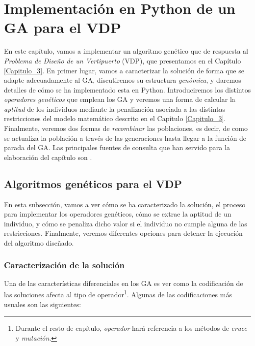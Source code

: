 \documentclass[12pt,a4paper]{book}
\begin{document}
\chapter{Implementación en Python de un GA para el VDP} \label{Capítulo 4}
En este capítulo, vamos a implementar un algoritmo genético que de respuesta al \textsl{Problema de Diseño de un Vertipuerto} (VDP), que presentamos en el Capítulo \ref{Capitulo_3}. En primer lugar, vamos a caracterizar la solución de forma que se adapte adecuadamente al GA, discutiremos su estructura \textsl{genómica}, y daremos detalles de cómo se ha implementado esta en Python. Introduciremos los distintos \textsl{operadores genéticos} que emplean los GA y veremos una forma de calcular la \textsl{aptitud} de los individuos mediante la penalización asociada a las distintas  restricciones del modelo matemático descrito en el Capítulo \ref{Capitulo_3}. Finalmente, veremos dos formas de \textsl{recombinar} las poblaciones, es decir, de como se actualiza la población a través de las generaciones hasta llegar a la función de parada del GA. Las principales fuentes de consulta que han servido para la elaboración del capítulo son  \cite{e_besada_optimizacion_nodate, gestal_pose_introduccion_2023, joines_use_1994, park_vertiport_2022, yu_introduction_2010}.

\section{Algoritmos genéticos para el VDP} \label{Subsubsec: 4_2_1}
En esta subsección, vamos a ver cómo se ha caracterizado la solución, el proceso para implementar los operadores genéticos, cómo se extrae la aptitud de un individuo, y cómo se penaliza dicho valor si el individuo no cumple alguna de las restricciones. Finalmente, veremos diferentes opciones para detener la ejecución del algoritmo diseñado.  
  
\subsection{Caracterización de la solución}

Una de las características diferenciales en los GA es ver como la codificación de las soluciones afecta al tipo de operador\footnote{Durante el resto de capítulo, \textsl{operador} hará referencia a los métodos de \textsl{cruce} y \textsl{mutación}.}. Algunas de las codificaciones más usuales son las siguientes: 
\end{document}
